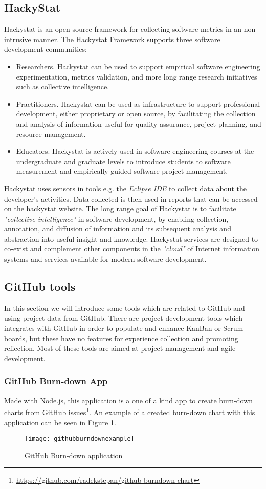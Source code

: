 \subsection{HackyStat}
Hackystat is an open source framework for collecting software metrics in an non-intrusive manner. 
The Hackystat Framework supports three software development communities:
\begin{itemize}
	\item Researchers. Hackystat can be used to support empirical software engineering experimentation, metrics validation, and more long range research initiatives such as collective intelligence.
	\item Practitioners. Hackystat can be used as infrastructure to support professional development, either proprietary or open source, by facilitating the collection and analysis of information useful for quality assurance, project planning, and resource management.
	\item Educators. Hackystat is actively used in software engineering courses at the undergraduate and graduate levels to introduce students to software measurement and empirically guided software project management.
\end{itemize}
Hackystat uses sensors in tools e.g. the \emph{Eclipse IDE} to collect data about the developer's activities. Data collected is then used in reports that can be accessed on the hackystat website. 
The long range goal of Hackystat is to facilitate \emph{"collective intelligence"} in software development, by enabling collection, annotation, and diffusion of information and its subsequent analysis and abstraction into useful insight and knowledge. Hackystat services are designed to co-exist and complement other components in the \emph{"cloud"} of Internet information systems and services available for modern software development.

\subsection{GitHub tools}
\label{subsec:gittools}
In this section we will introduce some tools which are related to GitHub and using project data from GitHub. There are project development tools which integrates with GitHub in order to populate and enhance KanBan or Scrum boards, but these have no features for experience collection and promoting reflection. Most of these tools are aimed at project management and agile development. 
\subsubsection*{GitHub Burn-down App}
Made with Node.js, this application is a one of a kind app to create burn-down charts from GitHub issues\footnote{\url{https://github.com/radekstepan/github-burndown-chart}}. An example of a created burn-down chart with this application can be seen in Figure \ref{githubburndownexample}. 
\begin{figure}[H]
\centering
	\texttt{[image: githubburndownexample]}
\caption{GitHub Burn-down application}
\label{githubburndownexample}
\end{figure}

